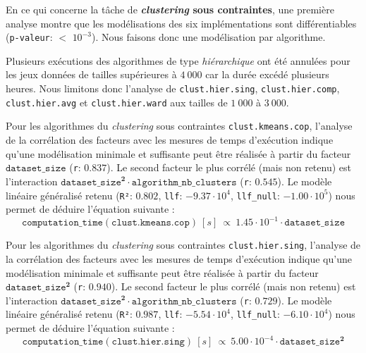 			
			En ce qui concerne la tâche de \textbf{\textit{clustering} sous contraintes}, une première analyse montre que les modélisations des six implémentations sont différentiables (\texttt{p-valeur}: $<$ \texttt{$10^{-3}$}). Nous faisons donc une modélisation par algorithme.
			
			\begin{leftBarWarning}
				Plusieurs exécutions des algorithmes de type \textit{hiérarchique} ont été annulées pour les jeux données de tailles supérieures à $4~000$ car la durée excédé plusieurs heures.
				Nous limitons donc l'analyse de \texttt{clust.hier.sing}, \texttt{clust.hier.comp}, \texttt{clust.hier.avg} et \texttt{clust.hier.ward} aux tailles de $1~000$ à $3~000$.
			\end{leftBarWarning}
			
			Pour les algorithmes du \textit{clustering} sous contraintes \texttt{clust.kmeans.cop}, l'analyse de la corrélation des facteurs avec les mesures de temps d'exécution indique qu'une modélisation minimale et suffisante peut être réalisée à partir du facteur $\texttt{dataset\_size}$ (\texttt{r}: $0.837$).
			Le second facteur le plus corrélé (mais non retenu) est l'interaction $\texttt{dataset\_size}^{\textbf{2}} \cdot \texttt{algorithm\_nb\_clusters}$ (\texttt{r}: $0.545$).
			Le modèle linéaire généralisé retenu (\texttt{R²}: $0.802$, \texttt{llf}: $-9.37 \cdot 10^{4}$, \texttt{llf\_null}: $-1.00 \cdot 10^{5}$) nous permet de déduire l'équation suivante :
			\begin{equation}
				\texttt{computation\_time}(\texttt{clust.kmeans.cop})~[s]~
				\propto~1.45 \cdot 10^{-1} \cdot \texttt{dataset\_size}
			\end{equation}
			
			Pour les algorithmes du \textit{clustering} sous contraintes \texttt{clust.hier.sing}, l'analyse de la corrélation des facteurs avec les mesures de temps d'exécution indique qu'une modélisation minimale et suffisante peut être réalisée à partir du facteur $\texttt{dataset\_size}^{\textbf{2}}$ (\texttt{r}: $0.940$).
			Le second facteur le plus corrélé (mais non retenu) est l'interaction $\texttt{dataset\_size}^{\textbf{2}} \cdot \texttt{algorithm\_nb\_clusters}$ (\texttt{r}: $0.729$).
			Le modèle linéaire généralisé retenu (\texttt{R²}: $0.987$, \texttt{llf}: $-5.54 \cdot 10^{4}$, \texttt{llf\_null}: $-6.10 \cdot 10^{4}$) nous permet de déduire l'équation suivante :
			\begin{equation}
				\texttt{computation\_time}(\texttt{clust.hier.sing})~[s]~
				\propto~5.00 \cdot 10^{-4} \cdot \texttt{dataset\_size}^{\textbf{2}}
			\end{equation}
			
